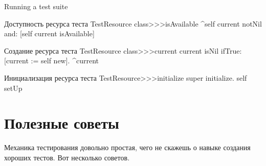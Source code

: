 \documentclass[a4paper,10pt,twoside]{book}
\begin{document}
\begin{method}[testsuiterun]{Running a test suite}
\begin{method}[testresourceisavailable]{Доступность ресурса теста}
TestResource class>>>isAvailable
	^self current notNil and: [self current isAvailable]
\end{method}
\begin{method}[testresourcecurrent]{Создание ресурса теста}
TestResource class>>>current
	current isNil ifTrue: [current := self new].
	^current
\end{method}
\begin{method}[restresourceinitialize]{Инициализация ресурса теста}
TestResource>>>initialize
	super initialize.
	self setUp
\end{method}
\section{Полезные советы}

Механика тестирования довольно простая, чего не скажешь о навыке создания хороших тестов.
Вот несколько советов.

\begin{description}



\end{description}
\end{method}
\end{document}
